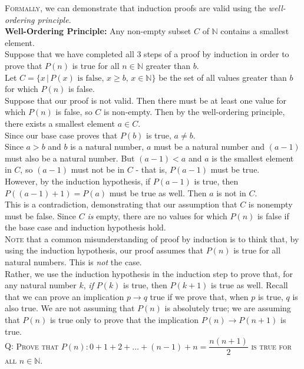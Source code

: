 \documentclass{article}
\begin{document}
\textsc{Formally}, we can demonstrate that induction proofs are valid using the \textit{well-ordering principle}.\\[1ex]
\textbf{Well-Ordering Principle:} Any non-empty subset $C$ of $\mathbb{N}$ contains a smallest element.\\[1em]
Suppose that we have completed all 3 steps of a proof by induction in order to prove that $P(n)$ is true for all $n\in\mathbb{N}$ greater than $b$.\\[1ex]
Let $C=\{x\,|\,P(x)\text{ is false},\,x\geq b,\, x\in\mathbb{N}\}$ be the set of all values greater than $b$ for which $P(n)$ is false.\\[1ex]
Suppose that our proof is not valid. Then there must be at least one value for which $P(n)$ is false, so $C$ is non-empty. Then by the well-ordering principle, there exists a smallest element $a\in C$.\\[1ex]
Since our base case proves that $P(b)$ is true, $a\neq b$.\\[1ex]
Since $a>b$ and $b$ is a natural number, $a$ must be a natural number and $(a-1)$ must also be a natural number. But $(a-1)<a$ and $a$ is the smallest element in $C$, so $(a-1)$ must not be in $C$ - that is, $P(a-1)$ must be true.\\[1ex]
However, by the induction hypothesis, if $P(a-1)$ is true, then $P((a-1)+1)=P(a)$ must be true as well. Then $a$ is not in $C$.\\[1ex]
This is a contradiction, demonstrating that our assumption that $C$ is nonempty must be false. Since $C$ \textit{is} empty, there are no values for which $P(n)$ is false if the base case and induction hypothesis hold.\\[1em]
\textsc{Note} that a common misunderstanding of proof by induction is to think that, by using the induction hypothesis, our proof assumes that $P(n)$ is true for all natural numbers. This is \textit{not} the case.\\[1ex]
Rather, we use the induction hypothesis in the induction step to prove that, for any natural number $k$, \textit{if} $P(k)$ is true, then $P(k+1)$ is true as well. Recall that we can prove an implication $p\to q$ true if we prove that, when $p$ is true, $q$ is also true. We are not assuming that $P(n)$ is absolutely true; we are assuming that $P(n)$ is true only to prove that the implication $P(n)\to P(n+1)$ is true.\\[1em]
Q: \textsc{Prove that $P(n): 0+1+2+\ldots+(n-1)+n=\dfrac{n(n+1)}{2}$ is true for all $n\in\mathbb{N}$.}\\[1ex]
\end{document}
